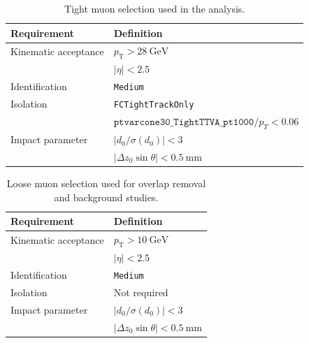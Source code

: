 \begin{table}[ht]
  \caption{Tight muon selection used in the analysis.}
  \label{tab:object:muon}
  \centering
  \begin{tabular}{ll}
    \toprule
    Requirement & Definition \\
    \midrule
    Kinematic acceptance &
    $p_{\mathrm{T}} > 28~\mathrm{GeV}$ \\
    &
    $|\eta| < 2.5$ \\
    \midrule
    Identification & \texttt{Medium} \\
    \midrule
    Isolation &
    \texttt{FCTightTrackOnly} \\
    &
    $\texttt{ptvarcone30\_TightTTVA\_pt1000}/p_T < 0.06$ \\
    \midrule
    Impact parameter &
    $|d_0/\sigma(d_0)| < 3$ \\
    &
    $|\Delta z_0 \sin\theta| < 0.5~\mathrm{mm}$ \\
    \bottomrule
  \end{tabular}
\end{table}

\begin{table}[ht]
  \caption{Loose muon selection used for overlap removal and background studies.}
  \label{tab:object:loose_muon}
  \centering
  \begin{tabular}{ll}
    \toprule
    Requirement & Definition \\
    \midrule
    Kinematic acceptance &
    $p_{\mathrm{T}} > 10~\mathrm{GeV}$ \\
    &
    $|\eta| < 2.5$ \\
    \midrule
    Identification & \texttt{Medium} \\
    \midrule
    Isolation & Not required \\
    \midrule
    Impact parameter &
    $|d_0/\sigma(d_0)| < 3$ \\
    &
    $|\Delta z_0 \sin\theta| < 0.5~\mathrm{mm}$ \\
    \bottomrule
  \end{tabular}
\end{table}



